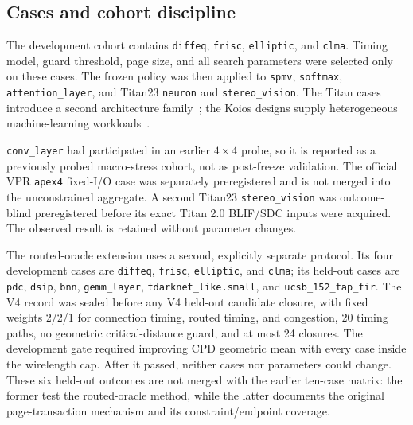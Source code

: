 \documentclass[sigconf,anonymous,review]{acmart}
\newcommand{\vpr}{\textsc{VPR}}
\begin{document}
\subsection{Cases and cohort discipline}

The development cohort contains \texttt{diffeq}, \texttt{frisc},
\texttt{elliptic}, and \texttt{clma}.  Timing model, guard threshold, page
size, and all search parameters were selected only on these cases.  The frozen
policy was then applied to \texttt{spmv}, \texttt{softmax},
\texttt{attention\_layer}, and Titan23 \texttt{neuron} and
\texttt{stereo\_vision}.  The Titan cases introduce
a second architecture family~\cite{murray2013titan,talaei2023titan2}; the
Koios designs supply heterogeneous machine-learning workloads~\cite{arora2021koios}.

\texttt{conv\_layer} had participated in an earlier $4\times4$ probe, so it is
reported as a previously probed macro-stress cohort, not as post-freeze
validation.  The official \vpr{} \texttt{apex4} fixed-I/O case was separately
preregistered and is not merged into the unconstrained aggregate.  A second
Titan23 \texttt{stereo\_vision} was outcome-blind preregistered before its
exact Titan 2.0 BLIF/SDC inputs were acquired.  The observed result is retained
without parameter changes.

The routed-oracle extension uses a second, explicitly separate protocol.  Its
four development cases are \texttt{diffeq}, \texttt{frisc},
\texttt{elliptic}, and \texttt{clma}; its held-out cases are \texttt{pdc},
\texttt{dsip}, \texttt{bnn}, \texttt{gemm\_layer},
\texttt{tdarknet\_like.small}, and \texttt{ucsb\_152\_tap\_fir}.  The V4
record was sealed before any V4 held-out candidate closure, with fixed
weights 2/2/1 for connection timing, routed timing, and congestion, 20 timing
paths, no geometric critical-distance guard, and at most 24 closures.  The
development gate required improving CPD geometric mean with every case inside
the wirelength cap.  After it passed, neither cases nor parameters could
change.  These six held-out outcomes are not merged with the earlier ten-case
matrix: the former test the routed-oracle method, while the latter documents
the original page-transaction mechanism and its constraint/endpoint coverage.

\begin{table}[t]
\centering
\scriptsize
\caption{Main-matrix cohort membership.  Macro entries are
macro/member counts; ``macro stress'' is excluded from post-freeze claims.}
\label{tab:cohorts}
\resizebox{\columnwidth}{!}{}
\end{table}
\end{document}

